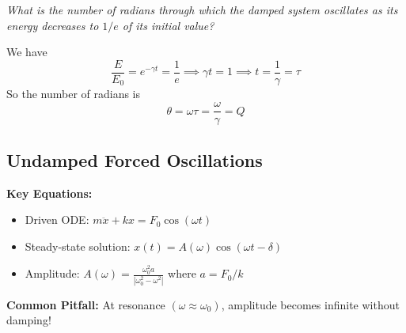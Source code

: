 \documentclass[11pt]{report}
\begin{document}
\begin{example}
    \textit{What is the number of radians through which the damped system oscillates as its energy decreases to $1/e$ of its initial value?}

    We have
    $$
    \frac{E}{E_0} = e^{-\gamma t} = \frac{1}{e} \implies \gamma t = 1 \implies t = \frac{1}{\gamma} = \tau
    $$
    So the number of radians is
    $$
    \theta = \omega \tau = \frac{\omega}{\gamma} = Q
    $$
    
\end{example}

\subsection{Undamped Forced Oscillations}

\begin{keybox}
\textbf{Key Equations:}
\begin{itemize}
    \item Driven ODE: $m\ddot{x} + kx = F_0\cos(\omega t)$
    \item Steady-state solution: $x(t) = A(\omega)\cos(\omega t - \delta)$
    \item Amplitude: $A(\omega) = \frac{\omega_0^2 a}{|\omega_0^2 - \omega^2|}$ where $a = F_0/k$
\end{itemize}
\textbf{Common Pitfall:} At resonance $(\omega \approx \omega_0)$, amplitude becomes infinite without damping!
\end{keybox}
\end{document}

